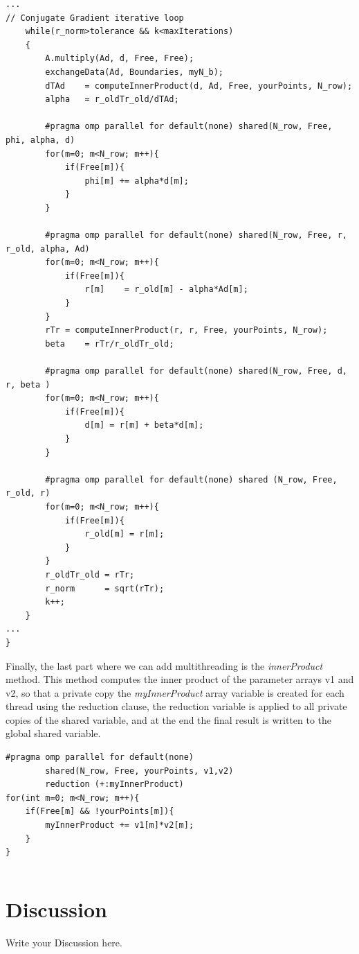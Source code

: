 \documentclass[12pt]{article}
\begin{document}
\begin{lstlisting}[style=MyC++Style]
...
// Conjugate Gradient iterative loop
    while(r_norm>tolerance && k<maxIterations)
    {
    	A.multiply(Ad, d, Free, Free);
		exchangeData(Ad, Boundaries, myN_b);
		dTAd	= computeInnerProduct(d, Ad, Free, yourPoints, N_row);
		alpha  	= r_oldTr_old/dTAd;
        
		#pragma omp parallel for default(none) shared(N_row, Free, phi, alpha, d)
		for(m=0; m<N_row; m++){
			if(Free[m]){
				phi[m] += alpha*d[m];
			}
		}
        
		#pragma omp parallel for default(none) shared(N_row, Free, r, r_old, alpha, Ad)
		for(m=0; m<N_row; m++){
			if(Free[m]){
				r[m]	= r_old[m] - alpha*Ad[m];
			}
		}
		rTr	= computeInnerProduct(r, r, Free, yourPoints, N_row);
		beta  	= rTr/r_oldTr_old;
        
		#pragma omp parallel for default(none) shared(N_row, Free, d, r, beta )
		for(m=0; m<N_row; m++){
			if(Free[m]){
				d[m] = r[m] + beta*d[m];
			}
		}
        
		#pragma omp parallel for default(none) shared (N_row, Free, r_old, r)
		for(m=0; m<N_row; m++){
			if(Free[m]){
				r_old[m] = r[m];
			}
		}
		r_oldTr_old	= rTr;
		r_norm		= sqrt(rTr);
		k++;
	}
...
}
\end{lstlisting}

Finally, the last part where we can add multithreading is the \textit{innerProduct} method. This method computes the inner product of the parameter arrays v1 and v2, so that a private copy the \textit{myInnerProduct} array variable is created for each thread using the reduction clause, the reduction variable is applied to all private copies of the shared variable, and at the end the final result is written to the global shared variable.

\begin{lstlisting}[style=MyC++Style]
#pragma omp parallel for default(none) 
		shared(N_row, Free, yourPoints, v1,v2) 
		reduction (+:myInnerProduct)
for(int m=0; m<N_row; m++){
	if(Free[m] && !yourPoints[m]){
		myInnerProduct += v1[m]*v2[m];
	}
}
\end{lstlisting}

\begin{lstlisting}[style=MyC++Style]

\end{lstlisting}
	
	\section{Discussion}
	Write your Discussion here.	
	
\end{document}
